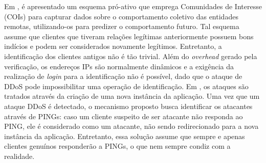 Em \cite{Verkaik:2006:PCD:1162666.1162673}, é apresentado um esquema pró-ativo que emprega Comunidades de Interesse (COIs) para capturar dados sobre o comportamento coletivo das entidades remotas, utilizando-os para predizer o comportamento futuro. Tal esquema assume que clientes que tiveram relações legítimas anteriormente possuem bons indícios e podem ser considerados novamente legítimos. %
%
Entretanto, a identificação dos clientes antigos não é tão trivial. Além do \emph{overhead} gerado pela verificação, os endereços IPs são normalmente dinâmicos e a exigência da realização de \emph{login} para a identificação não é possível, dado que o ataque de DDoS pode impossibilitar uma operação de identificação.
%
%
Em \cite{Bakshi:10}, os ataques são tratados através da criação de uma nova instância da aplicação. Uma vez que um ataque DDoS é detectado, o mecanismo proposto busca identificar os atacantes através de PINGs: caso um cliente suspeito de ser atacante não responda ao PING, ele é considerado como um atacante, não sendo redirecionado para a nova instância da aplicação. 
Entretanto, essa solução assume que sempre e apenas clientes genuínos responderão a PINGs, o que nem sempre condiz com a realidade.





